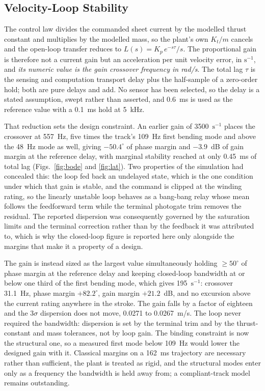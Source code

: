 \documentclass[conference]{IEEEtran}
\begin{document}
\subsection{Velocity-Loop Stability}\label{sec:control}
The control law divides the commanded sheet current by the modelled thrust constant and multiplies by the modelled mass, so the plant's own $K_t/m$ cancels and the open-loop transfer reduces to $L(s)=K_p\,e^{-s\tau}/s$. The proportional gain is therefore not a current gain but an acceleration per unit velocity error, in $\mathrm{s^{-1}}$, and \emph{its numeric value is the gain crossover frequency in rad/s}. The total lag $\tau$ is the sensing and computation transport delay plus the half-sample of a zero-order hold; both are pure delays and add. No sensor has been selected, so the delay is a stated assumption, swept rather than asserted, and 0.6~ms is used as the reference value with a 0.1~ms hold at 5~kHz.

That reduction sets the design constraint. An earlier gain of 3500~$\mathrm{s^{-1}}$ places the crossover at 557~Hz, five times the track's 109~Hz first bending mode and above the 48~Hz mode as well, giving $-50.4^\circ$ of phase margin and $-3.9$~dB of gain margin at the reference delay, with marginal stability reached at only 0.45~ms of total lag (Figs.~\ref{fig:bode} and \ref{fig:lat}). Two properties of the simulation had concealed this: the loop fed back an undelayed state, which is the one condition under which that gain is stable, and the command is clipped at the winding rating, so the linearly unstable loop behaves as a bang-bang relay whose mean follows the feedforward term while the terminal photogate trim removes the residual. The reported dispersion was consequently governed by the saturation limits and the terminal correction rather than by the feedback it was attributed to, which is why the closed-loop figure is reported here only alongside the margins that make it a property of a design.

The gain is instead sized as the largest value simultaneously holding $\geq 50^\circ$ of phase margin at the reference delay and keeping closed-loop bandwidth at or below one third of the first bending mode, which gives 195~$\mathrm{s^{-1}}$: crossover 31.1~Hz, phase margin $+82.2^\circ$, gain margin $+21.2$~dB, and no excursion above the current rating anywhere in the stroke. The gain falls by a factor of eighteen and the $3\sigma$ dispersion does not move, 0.0271 to 0.0267~m/s. The loop never required the bandwidth: dispersion is set by the terminal trim and by the thrust-constant and mass tolerances, not by loop gain. The binding constraint is now the structural one, so a measured first mode below 109~Hz would lower the designed gain with it. Classical margins on a 162~ms trajectory are necessary rather than sufficient, the plant is treated as rigid, and the structural modes enter only as a frequency the bandwidth is held away from; a compliant-track model remains outstanding.
\end{document}
